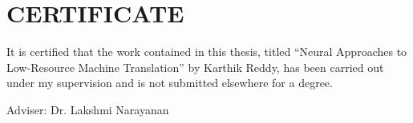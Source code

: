 \chapter*{CERTIFICATE}
It is certified that the work contained in this thesis, titled ``Neural Approaches to Low-Resource Machine Translation'' by
Karthik Reddy, has been carried out under my supervision and is not submitted
elsewhere for a degree.\par
\vspace{1in}
\noindent\rule{0pt}{0pt}\hfill Adviser: Dr. Lakshmi Narayanan
\clearpage
